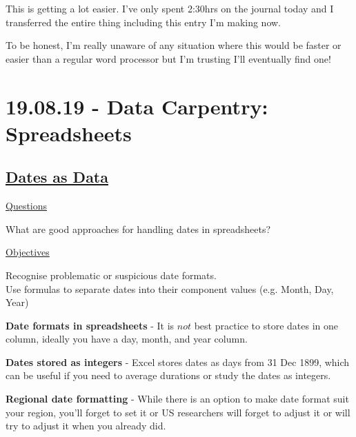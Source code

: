 \documentclass[12pt]{article}
\begin{document}
This is getting a lot easier. I've only spent 2:30hrs on the journal today and I transferred the entire thing including this entry I'm making now.

To be honest, I'm really unaware of any situation where this would be faster or easier than a regular word processor but I'm trusting I'll eventually find one!

\newpage\section{19.08.19 - Data Carpentry: Spreadsheets}

\subsection{\href{https://datacarpentry.org/spreadsheets-socialsci/03-dates-as-data/index.html}{\textbf{Dates as Data}}}

\color{gray}
\underline{Questions}

What are good approaches for handling dates in spreadsheets?

\underline{Objectives}

Recognise problematic or suspicious date formats.
\\Use formulas to separate dates into their component values (e.g. Month, Day, Year)
\color{black}

\vspace{1em}
\textbf{Date formats in spreadsheets} - It is $not$ best practice to store dates in one column, ideally you have a day, month, and year column.

\textbf{Dates stored as integers} - Excel stores dates as days from 31 Dec 1899, which can be useful if you need to average durations or study the dates as integers.

\textbf{Regional date formatting} - While there is an option to make date format suit your region, you'll forget to set it or US researchers will forget to adjust it or will try to adjust it when you already did.
\end{document}
